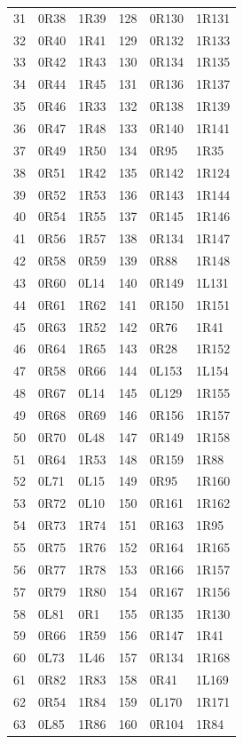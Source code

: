 {\begin{longtable}{@{}rll@{\qquad}rll@{}}
31 & 0R38 & 1R39 & 128 & 0R130 & 1R131\\
32 & 0R40 & 1R41 & 129 & 0R132 & 1R133\\
33 & 0R42 & 1R43 & 130 & 0R134 & 1R135\\
34 & 0R44 & 1R45 & 131 & 0R136 & 1R137\\
35 & 0R46 & 1R33 & 132 & 0R138 & 1R139\\
36 & 0R47 & 1R48 & 133 & 0R140 & 1R141\\
37 & 0R49 & 1R50 & 134 & 0R95 & 1R35\\
38 & 0R51 & 1R42 & 135 & 0R142 & 1R124\\
39 & 0R52 & 1R53 & 136 & 0R143 & 1R144\\
40 & 0R54 & 1R55 & 137 & 0R145 & 1R146\\
41 & 0R56 & 1R57 & 138 & 0R134 & 1R147\\
42 & 0R58 & 0R59 & 139 & 0R88 & 1R148\\
43 & 0R60 & 0L14 & 140 & 0R149 & 1L131\\
44 & 0R61 & 1R62 & 141 & 0R150 & 1R151\\
45 & 0R63 & 1R52 & 142 & 0R76 & 1R41\\
46 & 0R64 & 1R65 & 143 & 0R28 & 1R152\\
47 & 0R58 & 0R66 & 144 & 0L153 & 1L154\\
48 & 0R67 & 0L14 & 145 & 0L129 & 1R155\\
49 & 0R68 & 0R69 & 146 & 0R156 & 1R157\\
50 & 0R70 & 0L48 & 147 & 0R149 & 1R158\\
51 & 0R64 & 1R53 & 148 & 0R159 & 1R88\\
52 & 0L71 & 0L15 & 149 & 0R95 & 1R160\\
53 & 0R72 & 0L10 & 150 & 0R161 & 1R162\\
54 & 0R73 & 1R74 & 151 & 0R163 & 1R95\\
55 & 0R75 & 1R76 & 152 & 0R164 & 1R165\\
56 & 0R77 & 1R78 & 153 & 0R166 & 1R157\\
57 & 0R79 & 1R80 & 154 & 0R167 & 1R156\\
58 & 0L81 & 0R1 & 155 & 0R135 & 1R130\\
59 & 0R66 & 1R59 & 156 & 0R147 & 1R41\\
60 & 0L73 & 1L46 & 157 & 0R134 & 1R168\\
61 & 0R82 & 1R83 & 158 & 0R41 & 1L169\\
62 & 0R54 & 1R84 & 159 & 0L170 & 1R171\\
63 & 0L85 & 1R86 & 160 & 0R104 & 1R84\\

\end{longtable}}
